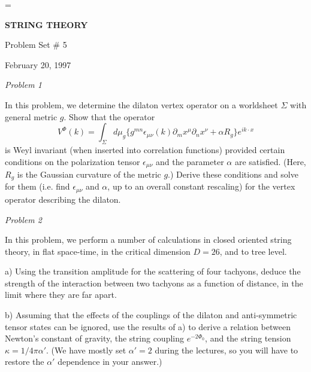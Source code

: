 


\magnification=
\overfullrule=0pt
\baselineskip=17pt
\def\det{{\rm det}}
\def\Det{{\rm Det}}
\def\tr{{\rm tr}}
\def\Tr{{\rm Tr}}
\def\12{{1 \over 2}}
\def\ker{{\rm Ker}}
\def\O{{\cal O}}

\centerline{{\bf STRING THEORY}}
\centerline{ Problem Set \# 5}
\centerline{February 20, 1997}

\bigskip
\bigskip

\noindent
{\it Problem 1}

\medskip

In this problem, we determine the dilaton vertex operator on 
a worldsheet $\Sigma$ with general metric $g$. Show that the operator
$$
V^{\Phi} (k) = \int _\Sigma d \mu _g
\{ g^{mn} \epsilon _{\mu \nu} (k) \partial _m x ^\mu \partial _n x ^\nu 
+ \alpha R_g
\} e^{ik\cdot x}
$$
is Weyl invariant (when inserted into correlation functions) 
provided certain conditions on the polarization
tensor $\epsilon _{\mu \nu}$ and the parameter $\alpha$ are satisfied.
(Here, $R_g$ is the Gaussian curvature of the metric $g$.)
Derive these conditions and solve for them 
(i.e. find $\epsilon _{\mu \nu}$ and $\alpha$, up to
an overall constant rescaling) for the vertex operator describing the
dilaton.

\bigskip

\noindent
{\it Problem 2}

\medskip

In this problem, we perform a number of calculations in closed
oriented string theory, in flat space-time, 
in the critical dimension $D=26$, and to tree level.

\noindent
a) Using the transition amplitude for the scattering of four
tachyons, deduce the strength of the interaction between two
tachyons as a function of distance, in the limit where they are far apart.

\noindent
b) Assuming that the effects of the couplings of the dilaton
and anti-symmetric tensor states can be ignored,
use the results of 
a) to derive a relation between Newton's constant of gravity,
the string coupling $e^{-2 \Phi _0}$, 
and the string tension $\kappa = 1/4\pi \alpha '$. 
(We have mostly set $\alpha '=2$ during the lectures,
so you will have to restore the $\alpha '$ dependence in your answer.)


